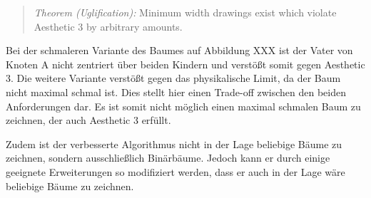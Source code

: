 \begin{quotation}
	\textit{Theorem (Uglification):} Minimum width drawings exist which violate Aesthetic 3 by arbitrary amounts.\cite[]{q1}
\end{quotation}

Bei der schmaleren Variante des Baumes auf Abbildung XXX ist der Vater von Knoten A nicht zentriert über beiden Kindern und verstößt somit 
gegen Aesthetic 3. Die weitere Variante verstößt gegen das physikalische Limit, da der Baum nicht maximal schmal ist. 
Dies stellt hier einen Trade-off zwischen den beiden Anforderungen dar. Es ist somit nicht möglich einen maximal schmalen Baum zu zeichnen,
der auch Aesthetic 3 erfüllt. 

Zudem ist der verbesserte Algorithmus nicht in der Lage beliebige Bäume zu zeichnen, sondern ausschließlich Binärbäume. Jedoch kann er durch
einige geeignete Erweiterungen so modifiziert werden, dass er auch in der Lage wäre beliebige Bäume zu zeichnen.
